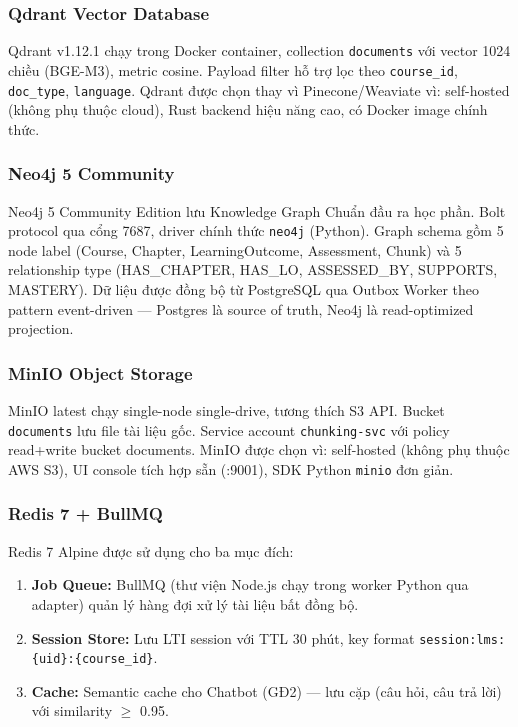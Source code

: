 \subsubsection{Qdrant Vector Database}

Qdrant v1.12.1 chạy trong Docker container, collection
\texttt{documents} với vector 1024 chiều (BGE-M3), metric cosine.
Payload filter hỗ trợ lọc theo \texttt{course\_id}, \texttt{doc\_type},
\texttt{language}. Qdrant được chọn thay vì Pinecone/Weaviate vì:
self-hosted (không phụ thuộc cloud), Rust backend hiệu năng cao,
có Docker image chính thức.

\subsubsection{Neo4j 5 Community}

Neo4j 5 Community Edition lưu Knowledge Graph Chuẩn đầu ra học phần.
Bolt protocol qua cổng 7687, driver chính thức
\texttt{neo4j} (Python). Graph schema gồm 5 node label
(Course, Chapter, LearningOutcome, Assessment, Chunk) và 5
relationship type (HAS\_CHAPTER, HAS\_LO, ASSESSED\_BY, SUPPORTS,
MASTERY). Dữ liệu được đồng bộ từ PostgreSQL qua Outbox Worker
theo pattern event-driven --- Postgres là source of truth, Neo4j
là read-optimized projection.

\subsubsection{MinIO Object Storage}

MinIO latest chạy single-node single-drive, tương thích S3 API.
Bucket \texttt{documents} lưu file tài liệu gốc. Service account
\texttt{chunking-svc} với policy read+write bucket documents.
MinIO được chọn vì: self-hosted (không phụ thuộc AWS S3), UI
console tích hợp sẵn (:9001), SDK Python \texttt{minio} đơn giản.

\subsubsection{Redis 7 + BullMQ}

Redis 7 Alpine được sử dụng cho ba mục đích:
\begin{enumerate}
    \item \textbf{Job Queue:} BullMQ (thư viện Node.js chạy trong
          worker Python qua adapter) quản lý hàng đợi xử lý tài
          liệu bất đồng bộ.
    \item \textbf{Session Store:} Lưu LTI session với TTL 30 phút,
          key format \texttt{session:lms:\{uid\}:\{course\_id\}}.
    \item \textbf{Cache:} Semantic cache cho Chatbot (GĐ2) ---
          lưu cặp (câu hỏi, câu trả lời) với similarity $\geq$ 0.95.
\end{enumerate}

